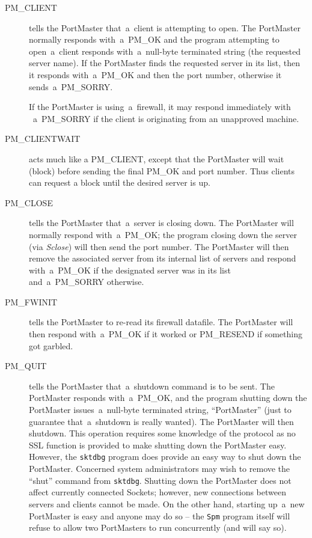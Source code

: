 \documentclass[12pt]{article}
\def\SSL{{\small SSL}}
\begin{document}
\begin{description}

  \item[{\small PM\_CLIENT}] tells the PortMaster that~a~client is attempting
       to open.  The PortMaster normally responds with~a~{\small PM\_OK} and the
       program attempting to open~a~client responds with~a~null-byte terminated
       string (the requested server name).  If the PortMaster finds the requested
       server in its list, then it responds with~a~{\small PM\_OK} and then the
       port number, otherwise it sends~a~{\small PM\_SORRY}.
     
       If the PortMaster is using~a~firewall, it may respond immediately with
      ~a~{\small PM\_SORRY} if the client is originating from an unapproved
       machine.

  \item[{\small PM\_CLIENTWAIT}] acts much like a {\small PM\_CLIENT}, except
        that the PortMaster will wait (block) before sending the final
        {\small PM\_OK} and port number.  Thus clients can request a block
        until the desired server is up.

  \item[{\small PM\_CLOSE}] tells the PortMaster that~a~server is closing down.
       The PortMaster will normally respond with~a~{\small PM\_OK}; the program
       closing down the server (via {\em Sclose}) will then send the port number.
       The PortMaster will then remove the associated server from its internal
       list of servers and respond with~a~{\small PM\_OK} if the designated
       server was in its list and~a~{\small PM\_SORRY} otherwise.

  \item[{\small PM\_FWINIT}] tells the PortMaster to re-read its firewall
       datafile.  The PortMaster will then respond with~a~{\small PM\_OK} if
       it worked or {\small PM\_RESEND} if something got garbled.

  \item[{\small PM\_QUIT}] tells the PortMaster that~a~shutdown command is
       to be sent.  The PortMaster responds with~a~{\small PM\_OK}, and the program
       shutting down the PortMaster issues~a~null-byte terminated string,
       ``PortMaster'' (just to guarantee that~a~shutdown is really wanted).  The
       PortMaster will then shutdown.  This operation requires some knowledge of
       the protocol as no {\SSL} function is provided to make shutting down the
       PortMaster easy.  However, the \verb`sktdbg` program does provide an easy
       way to shut down the PortMaster.  Concerned system administrators may wish
       to remove the ``shut'' command from \verb`sktdbg`.  Shutting down the
       PortMaster does not affect currently connected Sockets; however, new
       connections between servers and clients cannot be made.  On the other hand,
       starting up~a~new PortMaster is easy and anyone may do so -- the \verb`Spm`
       program itself will refuse to allow two PortMasters to run concurrently (and
       will say so).


\end{description}
\end{document}
